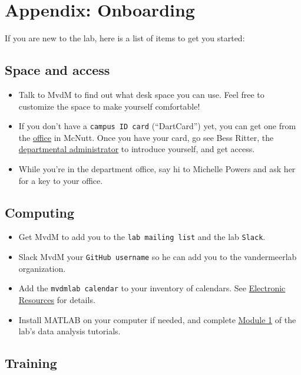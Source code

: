 \documentclass{tufte-book}
\newcommand{\doccls}[1]{\texttt{#1}}%
\begin{document}
\chapter{Appendix: Onboarding}

If you are new to the lab, here is a list of items to get you started:

\section{Space and access}

\begin{itemize}
\item{Talk to MvdM to find out what desk space you can use. Feel free
  to customize the space to make yourself comfortable!}
\item{If you don't have a \doccls{campus ID card} (``DartCard'') yet, you can get one
from the
\href{https://www.dartmouth.edu/finance/employee-services/other_services/dartcard/}{office}
in McNutt. Once you have your card, go see Bess Ritter, the \href{https://pbs.dartmouth.edu/people?field_people_local_tags_tid=1916}{departmental
administrator} to introduce yourself, and get access.}
\item{While you're in the department office, say hi to Michelle Powers
and ask her for a key to your office.}
\end{itemize}

\section{Computing}

\begin{itemize}
\item{Get MvdM to add you to the \doccls{lab mailing list} and the lab
  \doccls{Slack}.}
\item{Slack MvdM your \doccls{GitHub username} so he can add you to the
  vandermeerlab organization.}
\item{Add the \doccls{mvdmlab calendar} to your inventory of calendars. See
  \hyperref[sec:elec-resources]{Electronic Resources} for details.}
\item{Install MATLAB on your computer if needed, and complete \href{https://rcweb.dartmouth.edu/~mvdm/wiki/doku.php?id=analysis:nsb2017:week1}{Module 1}
  of the lab's data analysis tutorials.}
\end{itemize}

\section{Training}
\end{document}
